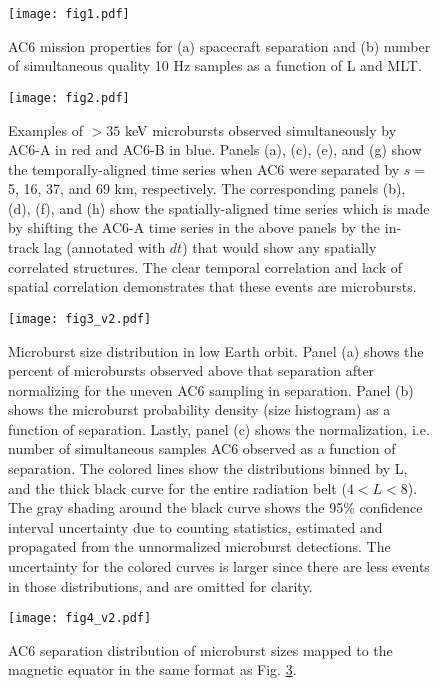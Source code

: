 \documentclass[draft]{agujournal2019}
\begin{document}
\begin{figure}
\texttt{[image: fig1.pdf]}
\caption{AC6 mission properties for (a) spacecraft separation and (b) number of simultaneous quality 10 Hz samples as a function of L and MLT.} \label{fig1}
\end{figure}

\begin{figure}
\texttt{[image: fig2.pdf]}
\caption{Examples of $>35$ keV microbursts observed simultaneously by AC6-A in red and AC6-B in blue. Panels (a), (c), (e), and (g) show the temporally-aligned time series when AC6 were separated by $s=$ 5, 16, 37, and 69 km, respectively. The corresponding panels (b), (d), (f), and (h) show the spatially-aligned time series which is made by shifting the AC6-A time series in the above panels by the in-track lag (annotated with $dt$) that would show any spatially correlated structures. The clear temporal correlation and lack of spatial correlation demonstrates that these events are microbursts.} 
\label{fig2}
\end{figure}

\begin{figure}
\texttt{[image: fig3\_v2.pdf]}
\caption{Microburst size distribution in low Earth orbit. Panel (a) shows the percent of microbursts observed above that separation after normalizing for the uneven AC6 sampling in separation. Panel (b) shows the microburst probability density (size histogram) as a function of separation. Lastly, panel (c) shows the normalization, i.e. number of simultaneous samples AC6 observed as a function of separation. The colored lines show the distributions binned by L, and the thick black curve for the entire radiation belt ($4 < L < 8$). The gray shading around the black curve shows the 95\% confidence interval uncertainty due to counting statistics, estimated and propagated from the unnormalized microburst detections. The uncertainty for the colored curves is larger since there are less events in those distributions, and are omitted for clarity.}
\label{fig3}
\end{figure}

\begin{figure}
\texttt{[image: fig4\_v2.pdf]}
\caption{AC6 separation distribution of microburst sizes mapped to the magnetic equator in the same format as Fig. \ref{fig3}.} 
\label{fig4}
\end{figure}
\end{document}
